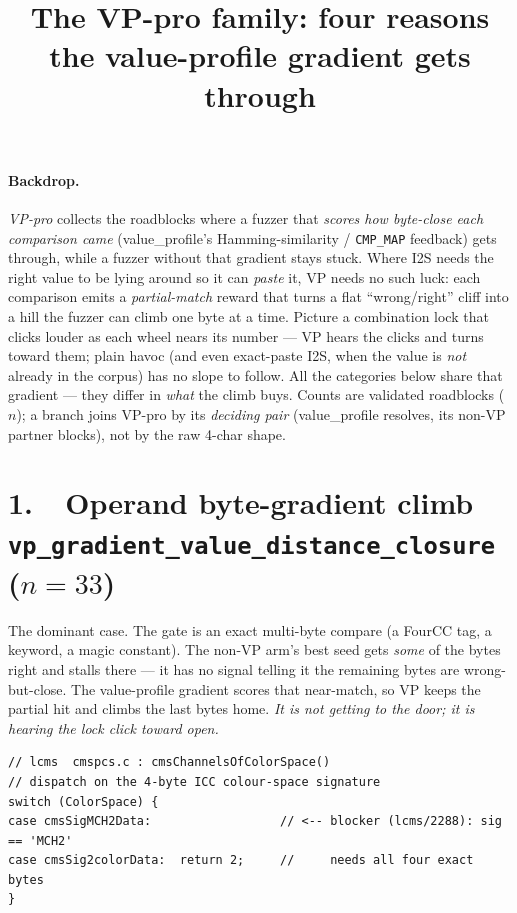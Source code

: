 \documentclass[11pt]{article}
\title{\textbf{The VP-pro family: four reasons the value-profile gradient gets through}}
\author{}
\date{}
\begin{document}
\maketitle
\vspace{-3em}

\paragraph{Backdrop.} \emph{VP-pro} collects the roadblocks where a fuzzer that
\emph{scores how byte-close each comparison came} (value\_profile's
Hamming-similarity / \texttt{CMP\_MAP} feedback) gets through, while a fuzzer
without that gradient stays stuck. Where I2S needs the right value to be lying
around so it can \emph{paste} it, VP needs no such luck: each comparison emits a
\emph{partial-match} reward that turns a flat ``wrong/right'' cliff into a hill
the fuzzer can climb one byte at a time. Picture a combination lock that clicks
louder as each wheel nears its number --- VP hears the clicks and turns toward
them; plain havoc (and even exact-paste I2S, when the value is \emph{not} already
in the corpus) has no slope to follow. All the categories below share that
gradient --- they differ in \emph{what} the climb buys. Counts are validated
roadblocks ($n$); a branch joins VP-pro by its \emph{deciding pair}
(value\_profile resolves, its non-VP partner blocks), not by the raw 4-char shape.

\section*{1.\ \ Operand byte-gradient climb \hfill {\normalsize\texttt{vp\_gradient\_value\_distance\_closure} ($n=33$)}}
The dominant case. The gate is an exact multi-byte compare (a FourCC tag, a
keyword, a magic constant). The non-VP arm's best seed gets \emph{some} of the
bytes right and stalls there --- it has no signal telling it the remaining bytes
are wrong-but-close. The value-profile gradient scores that near-match, so VP
keeps the partial hit and climbs the last bytes home. \emph{It is not getting to
the door; it is hearing the lock click toward open.}

\begin{lstlisting}[style=c]
// lcms  cmspcs.c : cmsChannelsOfColorSpace()
// dispatch on the 4-byte ICC colour-space signature
switch (ColorSpace) {
case cmsSigMCH2Data:                  // <-- blocker (lcms/2288): sig == 'MCH2'
case cmsSig2colorData:  return 2;     //     needs all four exact bytes
}
\end{lstlisting}
\end{document}
